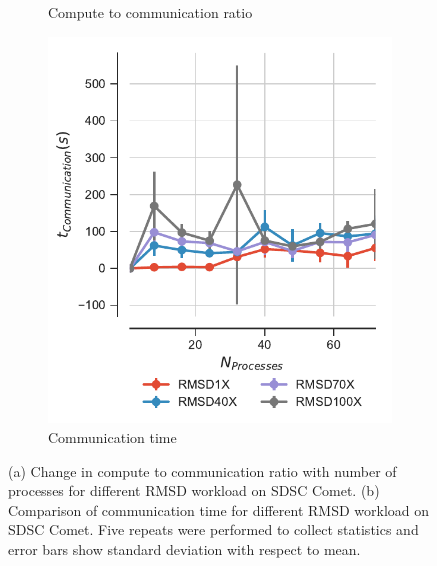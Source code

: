 \begin{figure}[ht!]
\begin{subfigure}{.3\textwidth}
  \captionsetup{format=hang}
\caption{Compute to communication ratio}
\label{fig:tcomp_tcomm_ratio}
\end{subfigure}
\hfill
\begin{subfigure}{.33\textwidth}
  \includegraphics[width=\linewidth]{figures/comm_comparison_different_RMSD_overload.pdf}
  \caption{Communication time}
  \label{fig:Comm_time_tcomp_tcomm_effect}
\end{subfigure}
\caption{(a) Change in compute to communication ratio with number of processes for different RMSD workload on SDSC Comet. 
(b) Comparison of communication time for different RMSD workload on SDSC Comet.
Five repeats were performed to collect statistics and error bars show standard deviation with respect to mean.}
\label{fig:tcom_tcomm_effect}
\end{figure}

